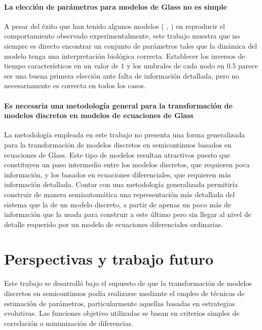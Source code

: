 \paragraph {La elección de parámetros para modelos de Glass no es simple} A pesar del éxito que han tenido algunos modelos (\citeauthor{AlvarezBuylla:2008cg} \citep{AlvarezBuylla:2008cg}, \citeauthor{Azpeitia:2010ik} \citep{Azpeitia:2010ik}) en reproducir el comportamiento observado experimentalmente, este trabajo muestra que no siempre es directo encontrar un conjunto de parámetros tales que la dinámica del modelo tenga una interpretación biológica correcta. Establecer los inversos de tiempo característicos en un valor de $1$ y los umbrales de cada nodo en $0.5$ parece ser una buena primera elección ante falta de información detallada, pero no necesariamente es correcta en todos los casos.

\paragraph {Es necesaria una metodología general para la transformación de modelos discretos en modelos de ecuaciones de Glass} La metodología empleada en este trabajo no presenta una forma generalizada para la transformación de modelos discretos en semicontinuos basados en ecuaciones de Glass. Este tipo de modelos resultan atractivos puesto que constituyen un paso intermedio entre los modelos discretos, que requieren poca información, y los basados en ecuaciones diferenciales, que requieren más información detallada. Contar con una metodología generalizada permitiría construir de manera semiautomática una representación más detallada del sistema que la de un modelo discreto, a partir de apenas un poco más de información que la usada para construir a este último pero sin llegar al nivel de detalle requerido por un modelo de ecuaciones diferenciales ordinarias.

\section{Perspectivas y trabajo futuro}

Este trabajo se desarrolló bajo el supuesto de que la transformación de modelos discretos en semicontinuos podía realizarse mediante el empleo de técnicas de estimación de parámetros, particularmente aquellas basadas en estrategias evolutivas. Las funciones objetivo utilizadas se basan en criterios simples de correlación o minimización de diferencias. 


